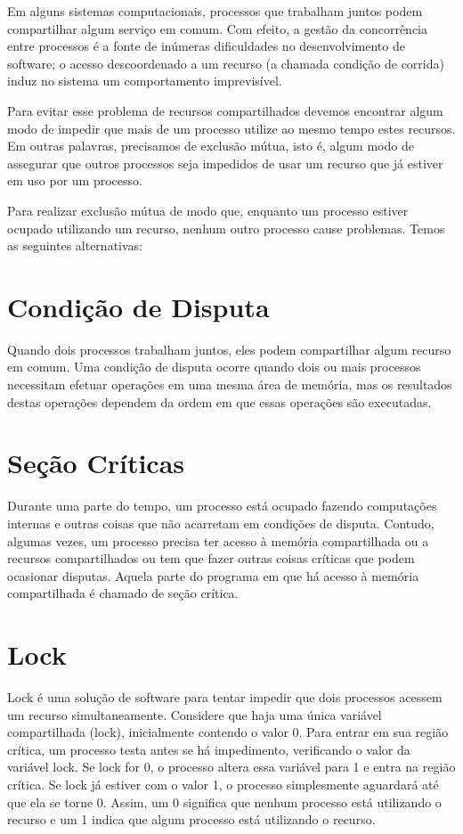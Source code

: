 
Em alguns sistemas computacionais, processos que trabalham juntos podem compartilhar algum 
serviço em comum. Com efeito, a gestão da concorrência entre processos é a fonte de inúmeras 
dificuldades no desenvolvimento de software; o acesso descoordenado a um recurso (a chamada 
condição de corrida) induz no sistema um comportamento imprevisível.

Para evitar esse problema de recursos compartilhados devemos encontrar algum modo de impedir 
que mais de um processo utilize ao mesmo tempo estes recursos. Em outras palavras, precisamos 
de exclusão mútua, isto é, algum modo de assegurar que outros processos seja impedidos de usar 
um recurso que já estiver em uso por um processo.

Para realizar exclusão mútua de modo que, enquanto um processo estiver ocupado utilizando um 
recurso, nenhum outro processo cause problemas. Temos as seguintes alternativas:


\section{Condição de Disputa}

Quando dois processos trabalham juntos, eles podem compartilhar algum recurso em comum. Uma condição de disputa ocorre quando dois ou mais processos necessitam efetuar operações em uma mesma área de memória, mas os resultados destas operações dependem da ordem em que essas operações são executadas.

\section{Seção Críticas}

Durante uma parte do tempo, um processo está ocupado fazendo computações internas e outras coisas que não acarretam
em condições de disputa. Contudo, algumas vezes, um processo precisa ter acesso à memória compartilhada ou a recursos compartilhados ou tem que fazer outras coisas críticas que podem ocasionar disputas. Aquela parte do programa
em que há acesso à memória compartilhada é chamado de seção crítica.


\section{Lock}

Lock é uma solução de software para tentar impedir que dois processos acessem um recurso 
simultaneamente. Considere que haja uma única variável compartilhada (lock), inicialmente 
contendo o valor 0. Para entrar em sua região crítica, um processo testa antes se há 
impedimento, verificando o valor da variável lock. Se lock for 0, o processo altera essa 
variável para 1 e entra na região crítica. Se lock já estiver com o valor 1, o processo 
simplesmente aguardará até que ela se torne 0. Assim, um 0 significa que nenhum processo 
está utilizando o recurso e um 1 indica que algum processo está utilizando o recurso. 



